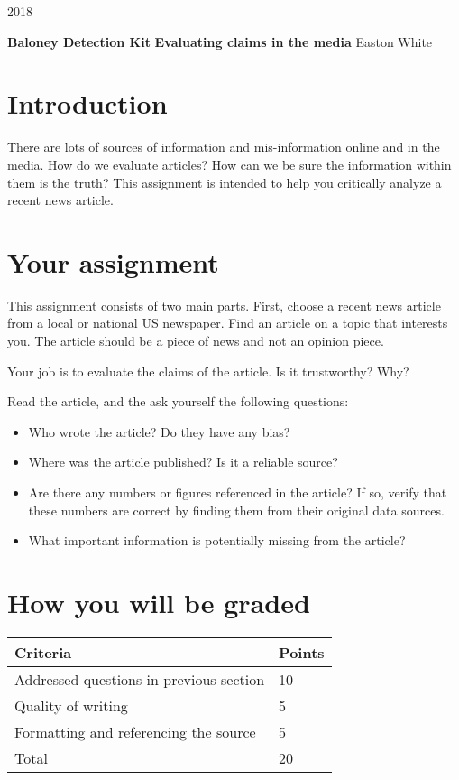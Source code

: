 \documentclass[11pt,]{article}
\title{}
\author{}
\date{}
\providecommand{\tightlist}{%
  \setlength{\itemsep}{0pt}\setlength{\parskip}{0pt}}
\begin{document}
\begin{flushright} 2018 \end{flushright}

\textbf{\Large Baloney Detection Kit} \newline
\textbf{Evaluating claims in the media} \newline
Easton White

\section{Introduction}

There are lots of sources of information and mis-information online and
in the media. How do we evaluate articles? How can we be sure the
information within them is the truth? This assignment is intended to
help you critically analyze a recent news article.

\section{Your assignment}

This assignment consists of two main parts. First, choose a recent news
article from a local or national US newspaper. Find an article on a
topic that interests you. The article should be a piece of news and not
an opinion piece.

Your job is to evaluate the claims of the article. Is it trustworthy?
Why?

Read the article, and the ask yourself the following questions:

\begin{itemize}
\tightlist
\item
  Who wrote the article? Do they have any bias?
\item
  Where was the article published? Is it a reliable source?
\item
  Are there any numbers or figures referenced in the article? If so,
  verify that these numbers are correct by finding them from their
  original data sources.
\item
  What important information is potentially missing from the article?
\end{itemize}

\section{How you will be graded}

\begin{table}[!h]
\begin{tabular}{l | l}
    Criteria & Points \\ \hline \hline
    Addressed questions in previous section & 10 \\
    Quality of writing & 5 \\
    Formatting and referencing the source & 5 \\ \hline
    Total & 20
\end{tabular}
\end{table}
\end{document}
